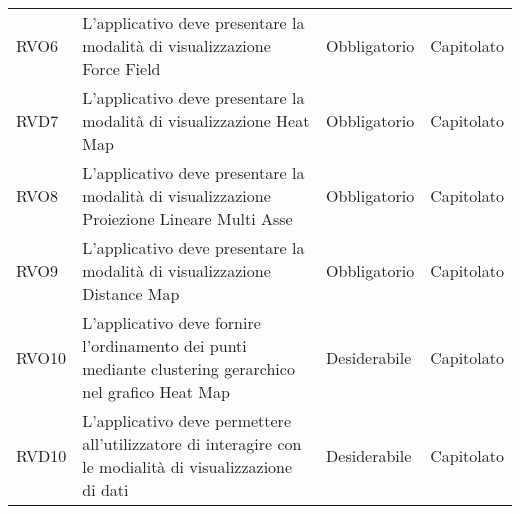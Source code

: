 \begin{longtable}[H]{|>{\raggedright\arraybackslash}p{20mm} | p{90mm} | p{22mm} | p{30mm} |}
    RVO6
        & L'applicativo deve presentare la modalità di visualizzazione Force Field
        & Obbligatorio
        & Capitolato \\

    RVD7
        & L'applicativo deve presentare la modalità di visualizzazione Heat Map
        & Obbligatorio
        & Capitolato \\

    RVO8
        & L'applicativo deve presentare la modalità di visualizzazione Proiezione Lineare Multi Asse
        & Obbligatorio
        & Capitolato \\

    RVO9
        & L'applicativo deve presentare la modalità di visualizzazione Distance Map
        & Obbligatorio
        & Capitolato \\

    RVO10
        & L'applicativo deve fornire l'ordinamento dei punti mediante clustering gerarchico nel grafico Heat Map
        & Desiderabile
        & Capitolato \\

    RVD10
        & L'applicativo deve permettere all'utilizzatore di interagire con le modialità di visualizzazione di dati
        & Desiderabile
        & Capitolato \\

\end{longtable}
